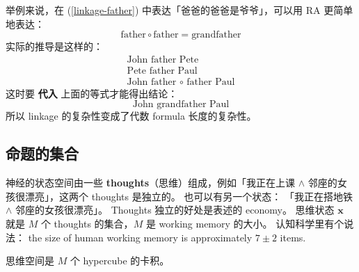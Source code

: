 \documentclass[orivec]{llncs}
\newcommand{\emp}[1]{\textbf{\textcolor{Cerulean}{#1}}}
\newcommand{\vect}[1]{\boldsymbol{#1}}
\begin{document}
举例来说，在 (\ref{linkage-father}) 中表达「爸爸的爸爸是爷爷」，可以用 RA 更简单地表达：
\begin{equation}
 \mbox{father} \circ \mbox{father} = \mbox{grandfather}
\end{equation}
实际的推导是这样的：
\begin{eqnarray}
\mbox{John father Pete} \nonumber \\
\mbox{Pete father Paul} \nonumber \\
\mbox{John father $\circ$ father Paul} 
\end{eqnarray}
这时要 \emp{代入} 上面的等式才能得出结论：
\begin{equation}
\mbox{John grandfather Paul}
\end{equation}
所以 linkage 的复杂性变成了代数 formula 长度的复杂性。 

\subsection{命题的集合}

神经的状态空间由一些 \emp{thoughts}（思维）组成，例如「我正在上课 $\wedge$ 邻座的女孩很漂亮」，这两个 thoughts 是独立的。 也可以有另一个状态： 「我正在搭地铁 $\wedge$ 邻座的女孩很漂亮」。  Thoughts 独立的好处是表述的 economy。 思维状态 $\vect{x}$ 就是 $M$ 个 thoughts 的集合，$M$ 是 working memory 的大小。 认知科学里有个说法： the size of human working memory is approximately $7 \pm 2$ items.

思维空间是 $M$ 个 hypercube 的卡积。
\end{document}
